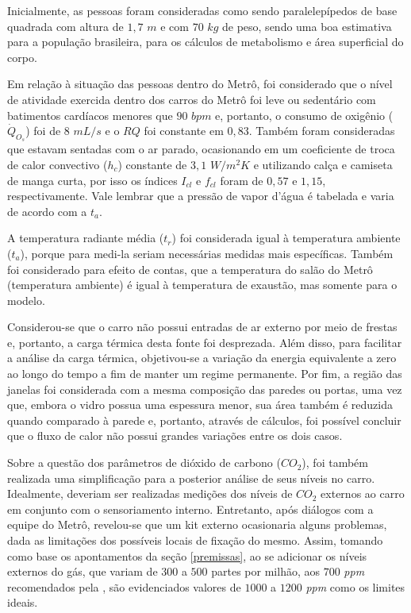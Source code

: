 \documentclass[acronym,symbols,table]{fei}
\begin{document}
Inicialmente, as pessoas foram consideradas como sendo paralelepípedos de base quadrada com altura de $1,7$ $m$ e com $70$ $kg$ de peso, sendo uma boa estimativa para a população brasileira, para os cálculos de metabolismo e área superficial do corpo.

Em relação à situação das pessoas dentro do Metrô, foi considerado que o nível de atividade exercida dentro dos carros do Metrô foi leve ou sedentário com batimentos cardíacos menores que $90$ $bpm$ e, portanto, o consumo de oxigênio ($\dot{Q}_{O_{s}}$) foi de $8$ $mL/s$ e o $RQ$ foi constante em $0,83$. Também foram consideradas que estavam sentadas com o ar parado, ocasionando em um coeficiente de troca de calor convectivo ($h_{c}$) constante de $3,1$ $W/m^2K$ e utilizando calça e camiseta de manga curta, por isso os índices $I_{cl}$ e $f_{cl}$ foram de $0,57$ e $1,15$, respectivamente. Vale lembrar que a pressão de vapor d'água é tabelada e varia de acordo com a $t_{a}$.

A temperatura radiante média ($t_{r}$) foi considerada igual à temperatura ambiente ($t_{a}$), porque para medi-la seriam necessárias medidas mais específicas. Também foi considerado para efeito de contas, que a temperatura do salão do Metrô (temperatura ambiente) é igual à temperatura de exaustão, mas somente para o modelo.
   
Considerou-se que o carro não possui entradas de ar externo por meio de frestas e, portanto, a carga térmica desta fonte foi desprezada. Além disso, para facilitar a análise da carga térmica, objetivou-se a variação da energia equivalente a zero ao longo do tempo a fim de manter um regime permanente. Por fim, a região das janelas foi considerada com a mesma composição das paredes ou portas, uma vez que, embora o vidro possua uma espessura menor, sua área também é reduzida quando comparado à parede e, portanto, através de cálculos, foi possível concluir que o fluxo de calor não possui grandes variações entre os dois casos.

Sobre a questão dos parâmetros de dióxido de carbono (${CO}_{2}$), foi também realizada uma simplificação para a posterior análise de seus níveis no carro. Idealmente, deveriam ser realizadas medições dos níveis de ${CO}_{2}$ externos ao carro em conjunto com o sensoriamento interno. Entretanto, após diálogos com a equipe do Metrô, revelou-se que um kit externo ocasionaria alguns problemas, dada as limitações dos possíveis locais de fixação do mesmo. Assim, tomando como base os apontamentos da seção \ref{premissas}, ao se adicionar os níveis externos do gás, que variam de $300$ a $500$ partes por milhão, aos $700$ \textit{ppm} recomendados pela \textcite{abnt17037}, são evidenciados valores de $1000$ a $1200$ \textit{ppm} como os limites ideais. 
\end{document}
